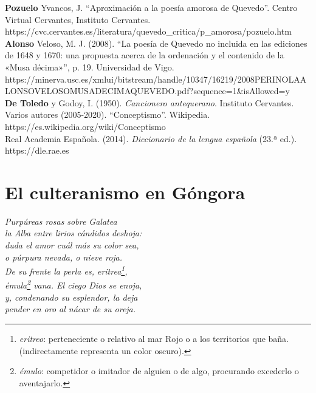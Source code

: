 \documentclass[12pt,a4paper]{article}
\begin{document}
\textbf{Pozuelo} Yvancos, J. ``Aproximación a la poesía amorosa de Quevedo''. Centro Virtual Cervantes, Instituto Cervantes.\\
https://cvc.cervantes.es/literatura/quevedo_critica/p_amorosa/pozuelo.htm\\

\textbf{Alonso} Veloso, M. J. (2008). ``La poesía de Quevedo no incluida en las ediciones de 1648 y 1670: una propuesta acerca de la ordenación y el contenido de la «Musa décima»'', p. 19. Universidad de Vigo.\\
https://minerva.usc.es/xmlui/bitstream/handle/10347/16219/2008PERINOLAALONSOVELOSOMUSADECIMAQUEVEDO.pdf?sequence=1\&isAllowed=y\\

\textbf{De Toledo} y Godoy, I. (1950). \textit{Cancionero antequerano}. Instituto Cervantes.\\

Varios autores (2005-2020). ``Conceptismo''. Wikipedia.\\
https://es.wikipedia.org/wiki/Conceptismo\\

Real Academia Española. (2014). \textit{Diccionario de la lengua española} (23.ª ed.).\\
https://dle.rae.es\\

\section{El culteranismo en Góngora}


\indent\textit{Purpúreas rosas sobre Galatea}\\
\indent\textit{la Alba entre lirios cándidos deshoja:}\\
\indent\textit{duda el amor cuál más su color sea,}\\
\indent\textit{o púrpura nevada, o nieve roja.}\\
\indent\textit{De su frente la perla es, eritrea\footnote{\textit{eritreo}: perteneciente o relativo al mar Rojo o a los territorios que baña. (indirectamente representa un color oscuro).},}\\
\indent\textit{émula\footnote{\textit{émulo}: competidor o imitador de alguien o de algo, procurando excederlo o aventajarlo.} vana. El ciego Dios se enoja,}\\
\indent\textit{y, condenando su esplendor, la deja}\\
\indent\textit{pender en oro al nácar de su oreja.}\\
\end{document}

